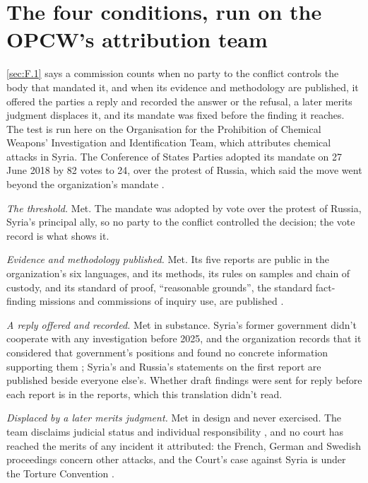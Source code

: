 \section{The four conditions, run on the OPCW's attribution team}
\label{sec:F.2}
\ref{sec:F.1} says a commission counts when no party to the conflict controls the body that mandated it, and when its evidence and methodology are published, it offered the parties a reply and recorded the answer or the refusal, a later merits judgment displaces it, and its mandate was fixed before the finding it reaches. The test is run here on the Organisation for the Prohibition of Chemical Weapons' Investigation and Identification Team, which attributes chemical attacks in Syria. The Conference of States Parties adopted its mandate on 27 June 2018 by 82 votes to 24, over the protest of Russia, which said the move went beyond the organization's mandate \autocite{opcw2018attribution,bbc2018opcwblame}.

\emph{The threshold.} Met. The mandate was adopted by vote over the protest of Russia, Syria's principal ally, so no party to the conflict controlled the decision; the vote record is what shows it.

\emph{Evidence and methodology published.} Met. Its five reports are public in the organization's six languages, and its methods, its rules on samples and chain of custody, and its standard of proof, “reasonable grounds”, the standard fact-finding missions and commissions of inquiry use, are published \autocite{opcw2026iitpage}.

\emph{A reply offered and recorded.} Met in substance. Syria's former government didn't cooperate with any investigation before 2025, and the organization records that it considered that government's positions and found no concrete information supporting them \autocite{opcw2026iitkafrzeita}; Syria's and Russia's statements on the first report are published beside everyone else's. Whether draft findings were sent for reply before each report is in the reports, which this translation didn't read.

\emph{Displaced by a later merits judgment.} Met in design and never exercised. The team disclaims judicial status and individual responsibility \autocite{opcw2026iitpage}, and no court has reached the merits of any incident it attributed: the French, German and Swedish proceedings concern other attacks, and the Court's case against Syria is under the Torture Convention \autocite{osji2021frenchcw,icj2023canadasyria}.

